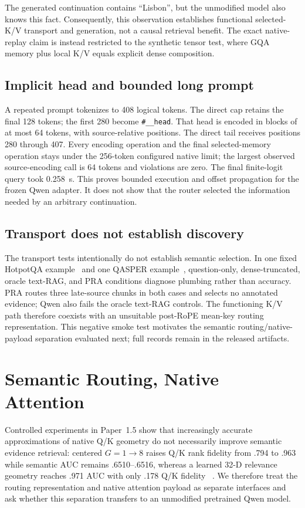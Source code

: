 \documentclass[11pt]{article}
\begin{document}
The generated continuation contains ``Lisbon'', but the unmodified model also knows this fact.
Consequently, this observation establishes functional selected-K/V transport and generation,
not a causal retrieval benefit. The exact native-replay claim is instead restricted to the
synthetic tensor test, where GQA memory plus local K/V equals explicit dense composition.

\subsection{Implicit head and bounded long prompt}

A repeated prompt tokenizes to 408 logical tokens. The direct cap retains the final 128 tokens;
the first 280 become \texttt{\#\_\_head}. That head is encoded in blocks of at most 64 tokens,
with source-relative positions. The direct tail receives positions 280 through 407. Every
encoding operation and the final selected-memory operation stays under the 256-token configured
native limit; the largest observed source-encoding call is 64 tokens and violations are zero.
The final finite-logit query took 0.258~s. This proves bounded execution and offset propagation
for the frozen Qwen adapter. It does not show that the router selected the information needed by
an arbitrary continuation.

\subsection{Transport does not establish discovery}

The transport tests intentionally do not establish semantic selection. In one fixed HotpotQA
example~\cite{yang2018hotpotqa} and one QASPER example~\cite{dasigi2021qasper}, question-only,
dense-truncated, oracle text-RAG, and PRA conditions diagnose plumbing rather than accuracy. PRA
routes three late-source chunks in both cases and selects no annotated evidence; Qwen also fails
the oracle text-RAG controls. The functioning K/V path therefore coexists with an unsuitable
post-RoPE mean-key routing representation. This negative smoke test motivates the semantic
routing/native-payload separation evaluated next; full records remain in the released artifacts.

\section{Semantic Routing, Native Attention}

Controlled experiments in Paper~1.5 show that increasingly accurate approximations of native Q/K
geometry do not necessarily improve semantic evidence retrieval: centered $G=1\rightarrow8$
raises Q/K rank fidelity from .794 to .963 while semantic AUC remains .6510--.6516, whereas a
learned 32-D relevance geometry reaches .971 AUC with only .178 Q/K fidelity
~\cite{simao2026position}. We therefore treat the routing representation and native attention
payload as separate interfaces and ask whether this separation transfers to an unmodified
pretrained Qwen model.
\end{document}
